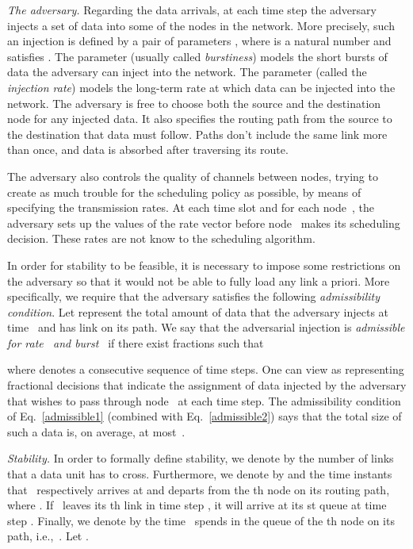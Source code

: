 \documentclass[journal,twocolumn]{./IEEEtran}
\begin{document}
\emph{The adversary.} Regarding the data arrivals, at each time step the adversary injects a set of data into some of the nodes in the network. More 
precisely,
such an injection is defined by a pair of parameters , where  is a natural number and  
satisfies
. The parameter  (usually called \emph{burstiness}) models the short bursts of data 
the adversary
can inject into the network. The parameter  (called the \emph{injection rate}) models the long-term rate at which data can be injected into the network. The adversary is free to choose both the source and the destination node for any injected data. It also specifies the routing path from 
the source to the destination that data must follow. Paths don't include the same link more than once, and data is absorbed after traversing its route. 

The adversary also controls the quality of channels between nodes, trying to create as much trouble for the scheduling policy as possible, by means of specifying the transmission rates. At each time slot and for each node~, the adversary sets up the values of the rate vector  before node~ makes its scheduling decision. 
These rates are not know to the scheduling algorithm.

In order for stability to be feasible, it is necessary to impose some restrictions on the adversary so that it 
would not be able to
fully load any link a priori. More specifically, we require that the adversary satisfies the following \emph{admissibility condition}. Let  represent the total amount of data that the adversary injects at time~ and has link  on its path. We say that the adversarial injection is 
{\em admissible for rate~ and burst~} if there exist fractions  such that




where  denotes a consecutive sequence of  time steps. One can 
view
 as representing fractional decisions that indicate the assignment of data injected by the adversary that wishes to pass through node~ at each time step. The admissibility condition of Eq.~\ref{admissible1} (combined with Eq.~\ref{admissible2}) says that the total size of such a data is, on average, at most~.

\emph{Stability.} In order to formally define stability, we denote by  the number of links that a data unit  has to cross. Furthermore, we denote by  and  the time instants that~ respectively arrives at and departs from  the th node on its routing path, where . If~ leaves its th link in time step , it will arrive at its st queue at time step . Finally, we denote by  the time~  spends in the queue of the th node on its path, i.e.,~. Let .
\end{document}
